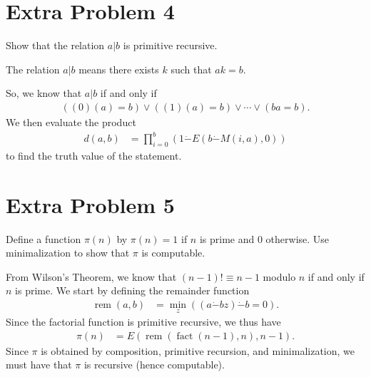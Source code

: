 \documentclass[10pt]{mypackage}
\begin{document}
\section{Extra Problem 4}%
\begin{problem}
  Show that the relation $a|b$ is primitive recursive.
\end{problem}
\begin{solution}
  The relation $a|b$ means there exists $k$ such that $ak = b$.\newline

  So, we know that $a|b$ if and only if
  \begin{align*}
    \left(\left(0\right)\left(a\right) = b\right) \vee \left(\left(1\right)\left(a\right) = b\right) \vee \cdots \vee \left(ba = b\right).
  \end{align*}
  We then evaluate the product
  \begin{align*}
    d\left(a,b\right) &= \prod_{i=0}^{b}\left(1\dot{-}E(b\dot{-}M(i,a),0)\right)
  \end{align*}
  to find the truth value of the statement.
\end{solution}
\section{Extra Problem 5}%
\begin{problem}
  Define a function $\pi(n)$ by $\pi(n) = 1$ if $n$ is prime and $0$ otherwise. Use minimalization to show that $\pi$ is computable.
\end{problem}
\begin{solution}
  From Wilson's Theorem, we know that $\left(n-1\right)! \equiv n-1$ modulo $n$ if and only if $n$ is prime. We start by defining the remainder function
  \begin{align*}
    \operatorname{rem}\left(a,b\right) &= \min_{z}\left(\left(a\dot{-} bz\right) \dot{-} b = 0\right).
  \end{align*}
  Since the factorial function is primitive recursive, we thus have
  \begin{align*}
    \pi\left(n\right) &= E\left(\operatorname{rem}\left(\operatorname{fact}\left(n-1\right),n\right),n-1\right).
  \end{align*}
  Since $\pi$ is obtained by composition, primitive recursion, and minimalization, we must have that $\pi$ is recursive (hence computable).
\end{solution}
\end{document}
